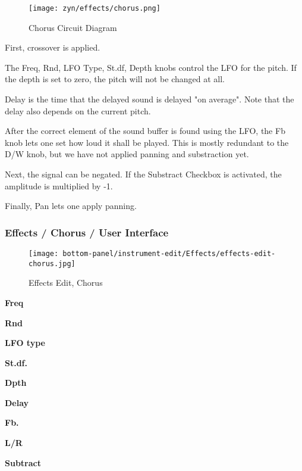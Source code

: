 \begin{figure}[H]
   \centering 
   \texttt{[image: zyn/effects/chorus.png]}
   \caption{Chorus Circuit Diagram}
   \label{fig:chorus_circuit_diagram}
\end{figure}

   First, crossover is applied.

   The Freq, Rnd, LFO Type, St.df, Depth knobs control the LFO
   for the pitch. If the depth is set to zero, the pitch will not be changed
   at all.

   Delay is the time that the delayed sound is delayed "on average". Note
   that the delay also depends on the current pitch.

   After the correct element of the sound buffer is found using the LFO, the
   Fb knob lets one set how loud it shall be played. This is mostly redundant
   to the D/W knob, but we have not applied panning and substraction yet.

   Next, the signal can be negated. If the Substract Checkbox is activated,
   the amplitude is multiplied by -1.

   Finally, Pan lets one apply panning.

\subsubsection{Effects / Chorus / User Interface}
\label{subsubsec:effects_edit_chorus_ui}

\begin{figure}[H]
   \centering 
   \texttt{[image: bottom-panel/instrument-edit/Effects/effects-edit-chorus.jpg]}
   \caption{Effects Edit, Chorus}
   \label{fig:effects_edit_chorus}
\end{figure}

   \begin{enumber}
      \item \textbf{Freq}
      \item \textbf{Rnd}
      \item \textbf{LFO type}
      \item \textbf{St.df.}
      \item \textbf{Dpth}
      \item \textbf{Delay}
      \item \textbf{Fb.}
      \item \textbf{L/R}
      \item \textbf{Subtract}
   \end{enumber}

